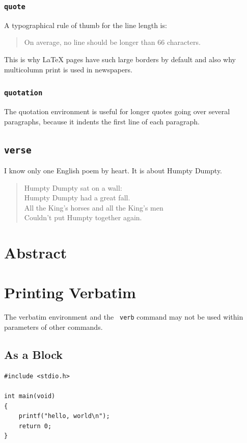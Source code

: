 \documentclass[a4paper]{article}
\begin{document}
\subsubsection*{\texttt{quote}}
A typographical rule of thumb
for the line length is:
\begin{quote}
On average, no line should
be longer than 66 characters.
\end{quote}
This is why \LaTeX{} pages have
such large borders by default
and also why multicolumn print
is used in newspapers.

\subsubsection*{\texttt{quotation}}
The quotation environment is useful for longer quotes
going over several paragraphs, because it indents the first
line of each paragraph.

\subsection{\texttt{verse}}
I know only one English poem by
heart. It is about Humpty Dumpty.
\begin{flushleft}
\begin{verse}
Humpty Dumpty sat on a wall:\\
Humpty Dumpty had a great fall.\\
All the King's horses and all
the King's men\\
Couldn't put Humpty together
again.
\end{verse}
\end{flushleft}

\newpage
\section{Abstract}
\begin{abstract}
\blindtext
\end{abstract}

\newpage
\section{Printing Verbatim}
The verbatim environment and the \texttt{ verb} command may not be used within parameters of other commands.

\subsection{As a Block}
\begin{verbatim}
#include <stdio.h>

int main(void)
{
    printf("hello, world\n");
    return 0;
}
\end{verbatim}
\end{document}
